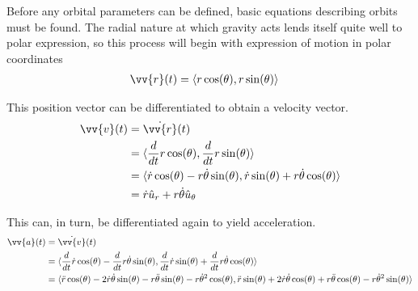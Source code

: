 \documentclass[../basicOrbitalDynamics.tex]{subfiles}
\begin{document}
Before any orbital parameters can be defined, basic equations describing orbits must be found. The radial nature at which gravity acts lends itself quite well to polar expression, so this process will begin with expression of motion in polar coordinates
\begin{align*}
    \vv{r}(t) & =\langle{}r\cos(\theta), r\sin(\theta)\rangle{}
\end{align*}

This position vector can be differentiated to obtain a velocity vector.
\begin{align*}
    \vv{v}(t) & =\dot{\vv{r}}(t)                                                                                                \\
              & =\langle{}\frac{d}{dt}r\cos(\theta), \frac{d}{dt}r\sin(\theta)\rangle{}                                         \\
              & =\langle{}\dot{r}\cos(\theta)-r\dot{\theta}\sin(\theta), \dot{r}\sin(\theta)+r\dot{\theta}\cos(\theta)\rangle{} \\
              & =\dot{r}\hat{u}_r+r\dot{\theta}\hat{u}_\theta
\end{align*}

This can, in turn, be differentiated again to yield acceleration.
\begin{align*}
    \vv{a}(t) & =\dot{\vv{v}}(t)                                                                                                                                                                                                                              \\
              & =\langle{}\frac{d}{dt}\dot{r}\cos(\theta)-\frac{d}{dt}r\dot{\theta}\sin(\theta), \frac{d}{dt}\dot{r}\sin(\theta)+\frac{d}{dt}r\dot{\theta}\cos(\theta)\rangle{}                                                                               \\
              & =\langle{}\ddot{r}\cos(\theta)-2\dot{r}\dot{\theta}\sin(\theta)-r\ddot{\theta}\sin(\theta)-r\dot{\theta}^2\cos(\theta), \ddot{r}\sin(\theta)+2\dot{r}\dot{\theta}\cos(\theta)+r\ddot{\theta}\cos(\theta)-r\dot{\theta}^2\sin(\theta)\rangle{}
\end{align*}
\end{document}

